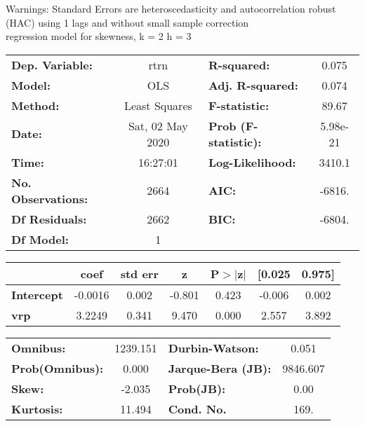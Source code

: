 Warnings: \newline
 [1] Standard Errors are heteroscedasticity and autocorrelation robust (HAC) using 1 lags and without small sample correction\\ 

regression model for skewness, k = 2 h = 3\begin{center}
\begin{tabular}{lclc}
\toprule
\textbf{Dep. Variable:}    &       rtrn       & \textbf{  R-squared:         } &     0.075   \\
\textbf{Model:}            &       OLS        & \textbf{  Adj. R-squared:    } &     0.074   \\
\textbf{Method:}           &  Least Squares   & \textbf{  F-statistic:       } &     89.67   \\
\textbf{Date:}             & Sat, 02 May 2020 & \textbf{  Prob (F-statistic):} &  5.98e-21   \\
\textbf{Time:}             &     16:27:01     & \textbf{  Log-Likelihood:    } &    3410.1   \\
\textbf{No. Observations:} &        2664      & \textbf{  AIC:               } &    -6816.   \\
\textbf{Df Residuals:}     &        2662      & \textbf{  BIC:               } &    -6804.   \\
\textbf{Df Model:}         &           1      & \textbf{                     } &             \\
\bottomrule
\end{tabular}
\begin{tabular}{lcccccc}
                   & \textbf{coef} & \textbf{std err} & \textbf{z} & \textbf{P$> |$z$|$} & \textbf{[0.025} & \textbf{0.975]}  \\
\midrule
\textbf{Intercept} &      -0.0016  &        0.002     &    -0.801  &         0.423        &       -0.006    &        0.002     \\
\textbf{vrp}       &       3.2249  &        0.341     &     9.470  &         0.000        &        2.557    &        3.892     \\
\bottomrule
\end{tabular}
\begin{tabular}{lclc}
\textbf{Omnibus:}       & 1239.151 & \textbf{  Durbin-Watson:     } &    0.051  \\
\textbf{Prob(Omnibus):} &   0.000  & \textbf{  Jarque-Bera (JB):  } & 9846.607  \\
\textbf{Skew:}          &  -2.035  & \textbf{  Prob(JB):          } &     0.00  \\
\textbf{Kurtosis:}      &  11.494  & \textbf{  Cond. No.          } &     169.  \\
\bottomrule
\end{tabular}
\end{center}

